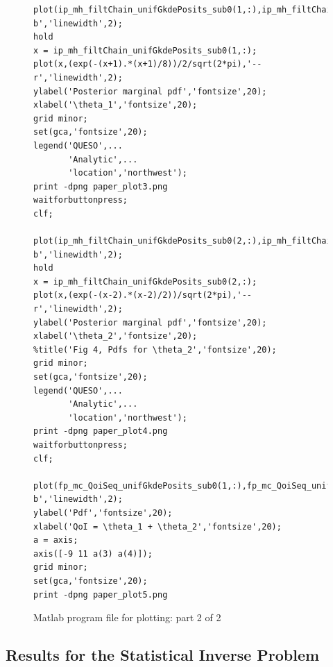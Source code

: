 \begin{figure}[h!]
\begin{center}
\begin{verbatim}
plot(ip_mh_filtChain_unifGkdePosits_sub0(1,:),ip_mh_filtChain_unifGkdeValues_sub0(1,:),'-b','linewidth',2);
hold
x = ip_mh_filtChain_unifGkdePosits_sub0(1,:);
plot(x,(exp(-(x+1).*(x+1)/8))/2/sqrt(2*pi),'--r','linewidth',2);
ylabel('Posterior marginal pdf','fontsize',20);
xlabel('\theta_1','fontsize',20);
grid minor;
set(gca,'fontsize',20);
legend('QUESO',...
       'Analytic',...
       'location','northwest');
print -dpng paper_plot3.png
waitforbuttonpress;
clf;

plot(ip_mh_filtChain_unifGkdePosits_sub0(2,:),ip_mh_filtChain_unifGkdeValues_sub0(2,:),'-b','linewidth',2);
hold
x = ip_mh_filtChain_unifGkdePosits_sub0(2,:);
plot(x,(exp(-(x-2).*(x-2)/2))/sqrt(2*pi),'--r','linewidth',2);
ylabel('Posterior marginal pdf','fontsize',20);
xlabel('\theta_2','fontsize',20);
%title('Fig 4, Pdfs for \theta_2','fontsize',20);
grid minor;
set(gca,'fontsize',20);
legend('QUESO',...
       'Analytic',...
       'location','northwest');
print -dpng paper_plot4.png
waitforbuttonpress;
clf;

plot(fp_mc_QoiSeq_unifGkdePosits_sub0(1,:),fp_mc_QoiSeq_unifGkdeValues_sub0(1,:),'-b','linewidth',2);
ylabel('Pdf','fontsize',20);
xlabel('QoI = \theta_1 + \theta_2','fontsize',20);
a = axis;
axis([-9 11 a(3) a(4)]);
grid minor;
set(gca,'fontsize',20);
print -dpng paper_plot5.png
\end{verbatim}
\end{center}
\caption{
Matlab program file for plotting: part 2 of 2
}
\label{fig-plots-2}
\end{figure}

\subsection{Results for the Statistical Inverse Problem}

